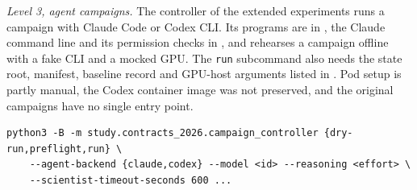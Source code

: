 \emph{Level 3, agent campaigns.} The controller of the extended experiments runs a campaign with Claude Code or Codex CLI. Its programs are in , the Claude command line and its permission checks in , and  rehearses a campaign offline with a fake CLI and a mocked GPU. The \texttt{run} subcommand also needs the state root, manifest, baseline record and GPU-host arguments listed in . Pod setup is partly manual, the Codex container image was not preserved, and the original campaigns have no single entry point.
\par\begingroup\footnotesize
\begin{verbatim}
python3 -B -m study.contracts_2026.campaign_controller {dry-run,preflight,run} \
    --agent-backend {claude,codex} --model <id> --reasoning <effort> \
    --scientist-timeout-seconds 600 ...
\end{verbatim}
\par\endgroup

